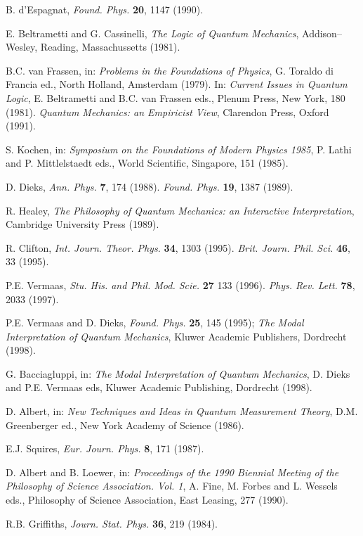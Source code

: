 \documentclass[10pt,a4paper]{article}
\begin{document}
\begin{thebibliography}{999}
 B. d'Espagnat, {\it Found. Phys.} {\bf 20}, 1147
(1990).

 E. Beltrametti and G. Cassinelli, {\it The Logic of
Quantum Mechanics}, Addison--Wesley, Reading, Massachussetts
(1981).

 B.C. van Frassen, in: {\it Problems in the
Foundations of Physics}, G. Toraldo di Francia ed., North Holland,
Amsterdam (1979). In: {\it Current Issues in Quantum Logic}, E.
Beltrametti and B.C. van Frassen eds., Plenum Press, New York, 180
(1981). {\it Quantum Mechanics: an Empiricist View}, Clarendon
Press, Oxford (1991).

 S. Kochen, in: {\it Symposium on the Foundations of
Modern Physics 1985}, P. Lathi and P. Mittlelstaedt eds., World
Scientific, Singapore, 151 (1985).

 D. Dieks, {\it Ann. Phys.} {\bf 7}, 174 (1988).
{\it Found. Phys.} {\bf 19}, 1387 (1989).

 R. Healey, {\it The Philosophy of Quantum
Mechanics: an Interactive Interpretation}, Cambridge University
Press (1989).

 R. Clifton, {\it Int. Journ. Theor. Phys.} {\bf
34}, 1303 (1995). {\it Brit. Journ. Phil. Sci.} {\bf 46}, 33
(1995).

 P.E. Vermaas, {\it Stu. His. and Phil. Mod. Scie.}
{\bf 27} 133 (1996). {\it Phys. Rev. Lett.} {\bf 78}, 2033 (1997).

 P.E. Vermaas and D. Dieks, {\it Found. Phys.} {\bf
25}, 145 (1995); {\it The Modal Interpretation of Quantum
Mechanics}, Kluwer Academic Publishers, Dordrecht (1998).

 G. Bacciagluppi, in: {\it The Modal Interpretation of
Quantum Mechanics}, D. Dieks and P.E. Vermaas eds, Kluwer Academic
Publishing, Dordrecht (1998).

 D. Albert, in: {\it New Techniques and Ideas in
Quantum Measurement Theory}, D.M. Greenberger ed., New York
Academy of Science (1986).

 E.J. Squires, {\it Eur. Journ. Phys.} {\bf 8}, 171
(1987).

 D. Albert and B. Loewer, in:  {\it Proceedings of
the 1990 Biennial Meeting of the Philosophy of Science
Association. Vol. 1}, A. Fine, M. Forbes and L. Wessels eds.,
Philosophy of Science Association, East Leasing, 277 (1990).

 R.B. Griffiths, {\it Journ. Stat. Phys.} {\bf 36},
219 (1984).


\end{thebibliography}
\end{document}
